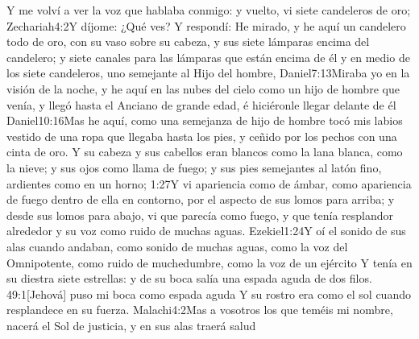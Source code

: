 Y me volví a ver la voz que hablaba conmigo: y vuelto, vi siete candeleros de oro;%
	{Zechariah}{4:2}{Y díjome: ¿Qué ves? Y respondí: He mirado, y he aquí un candelero todo de oro, con su vaso sobre su cabeza, y sus siete lámparas encima del candelero; y siete canales para las lámparas que están encima de él}
y en medio de los siete candeleros, uno semejante al Hijo del hombre,%
%
			{Daniel}{7:13}{Miraba yo en la visión de la noche, y he aquí en las nubes del cielo como un hijo de hombre que venía, y llegó hasta el Anciano de grande edad, é hiciéronle llegar delante de él}%
			{Daniel}{10:16}{Mas he aquí, como una semejanza de hijo de hombre tocó mis labios}%
 vestido de una ropa que llegaba hasta los pies, y ceñido por los pechos con una cinta de oro.%
Y su cabeza y sus cabellos eran blancos como la lana blanca, como la nieve;%
 y sus ojos como llama de fuego;%
y sus pies semejantes al latón fino, ardientes como en un horno;%
			{1:27}{Y vi apariencia como de ámbar, como apariencia de fuego dentro de ella en contorno, por el aspecto de sus lomos para arriba; y desde sus lomos para abajo, vi que parecía como fuego, y que tenía resplandor alrededor}%
 y su voz como ruido de muchas aguas.%
        		{Ezekiel}{1:24}{Y oí el sonido de sus alas cuando andaban, como sonido de muchas aguas, como la voz del Omnipotente, como ruido de muchedumbre, como la voz de un ejército}
Y tenía en su diestra siete estrellas: y de su boca salía una espada aguda de dos filos.%
				{49:1}{[Jehová] puso mi boca como espada aguda}
 Y su rostro era como el sol cuando resplandece en su fuerza.%
			{Malachi}{4:2}{Mas a vosotros los que teméis mi nombre, nacerá el Sol de justicia, y en sus alas traerá salud}

